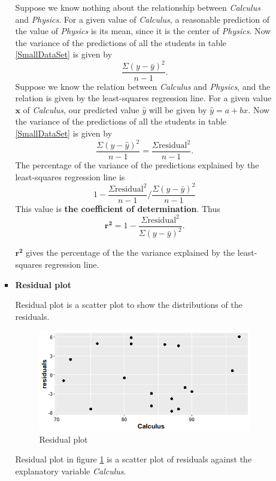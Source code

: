 \documentclass[a4paper, 12pt,twoside]{book}
\begin{document}
\begin{itemize}
\begin{itemize}
\begin{itemize}
Suppose we know nothing about the relationship between \textit{Calculus} and \textit{Physics}. For a given value of \textit{Calculus}, a reasonable prediction of the value of \textit{Physics} is its mean, since it is the center of \textit{Physics}. Now the variance of the predictions of all the students in table \ref{SmallDataSet} is given by 
$$\frac{\Sigma(y-\bar{y})^2}{n-1}.$$
Suppose we know the relation between \textit{Calculus} and \textit{Physics}, and the relation is given by the least-squares regression line. For a given value $\mathbf{x}$ of \textit{Calculus}, our predicted value $\hat{y}$ will be given by $\hat{y} = a + bx$. Now the variance of the predictions of all the students in table \ref{SmallDataSet} is given by 
$$\frac{\Sigma(y-\hat{y})^2}{n-1} = \frac{\Sigma\text{residual}^2}{n-1} .$$
The percentage of the variance of the predictions explained by the least-squares regression line is $$1-\frac{\Sigma\text{residual}^2}{n-1}\Bigg/\frac{\Sigma(y-\bar{y})^2}{n-1}$$
This value is \textbf{the coefficient of determination}. Thus
$$\mathbf{r^2} = 1- \frac{\Sigma\text{residual}^2}{\Sigma(y-\bar{y})^2}.$$
\colorbox{babypink}{\parbox{13.2cm}{$\mathbf{r^2}$ gives the percentage of the the variance explained by the least-squares regression line.}}
\vspace{0.6cm}

\item \textbf{Residual plot}
\vspace{0.6cm}

Residual plot is a scatter plot to show the distributions of the residuals. 
\begin{figure}[H]
\centering
\includegraphics[scale=0.5]{ResidualPlot.png}
\caption{Residual plot}
\label{ResidualPlot}
\end{figure}
Residual plot in figure \ref{ResidualPlot} is a scatter plot of residuals against the explanatory variable \textit{Calculus}.
\vspace{0.6cm}


\end{itemize}
\end{itemize}
\end{itemize}
\end{document}
